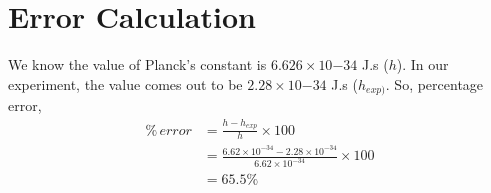 \documentclass[a4paper,12pt]{article}
\begin{document}
\section{Error Calculation}
We know the value of Planck's constant is \(6.626 \times 10{-34}\) J.s (\(h\)). In our experiment, the value comes out to be \(2.28 \times 10{-34}\) J.s (\(h_{exp)}\).
So, percentage error,
\begin{align*}
    \%\, error &=  \frac{h - h_{exp}}{h} \times 100\\
    &= \frac{6.62 \times 10^{-34} - 2.28 \times 10^{-34}}{6.62 \times 10^{-34} } \times 100\\
    &= 65.5 \%
\end{align*}
\end{document}
